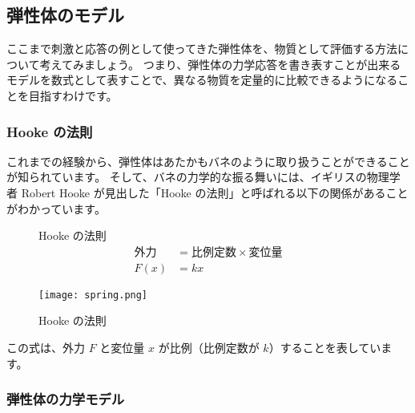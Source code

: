 \documentclass[uplatex,dvipdfmx,a4paper,11pt]{jsarticle}
\begin{document}
\subsection{弾性体のモデル}

ここまで刺激と応答の例として使ってきた弾性体を、物質として評価する方法について考えてみましょう。
つまり、弾性体の力学応答を書き表すことが出来るモデルを数式として表すことで、異なる物質を定量的に比較できるようになることを目指すわけです。

\subsubsection{Hooke の法則}

これまでの経験から、弾性体はあたかもバネのように取り扱うことができることが知られています。
そして、バネの力学的な振る舞いには、イギリスの物理学者 Robert Hooke が見出した「Hooke の法則」と呼ばれる以下の関係があることがわかっています。
\begin{figure}[htb]
	\begin{center}
		\begin{minipage}{0.45\textwidth}
			\large
			\begin{itembox}[l]{Hooke の法則}
				\vspace{-3mm}
				\begin{align*}
					\text{外力} &= \text{比例定数} \times \text{変位量} \\[8pt]
					F(x) &= k x
				\end{align*}
			\end{itembox}
		\end{minipage}
		\begin{minipage}{0.45\textwidth}
			\begin{center}
			\texttt{[image: spring.png]}
			\end{center}
		\end{minipage}
		\caption{Hooke の法則}
		\label{hook}
	\end{center}
\end{figure}

この式は、外力 $F$ と変位量 $x$ が比例（比例定数が $k$）することを表しています。

\subsubsection{弾性体の力学モデル}
\end{document}
